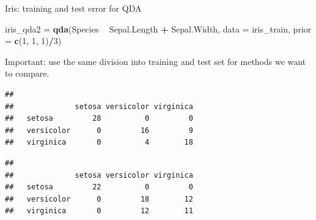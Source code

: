 \documentclass[10pt,ignorenonframetext,]{beamer}
\newenvironment{Shaded}{\begin{snugshade}}{\end{snugshade}}
\newcommand{\KeywordTok}[1]{\textcolor[rgb]{0.13,0.29,0.53}{\textbf{#1}}}
\newcommand{\DataTypeTok}[1]{\textcolor[rgb]{0.13,0.29,0.53}{#1}}
\newcommand{\DecValTok}[1]{\textcolor[rgb]{0.00,0.00,0.81}{#1}}
\newcommand{\StringTok}[1]{\textcolor[rgb]{0.31,0.60,0.02}{#1}}
\newcommand{\CommentTok}[1]{\textcolor[rgb]{0.56,0.35,0.01}{\textit{#1}}}
\newcommand{\OperatorTok}[1]{\textcolor[rgb]{0.81,0.36,0.00}{\textbf{#1}}}
\newcommand{\NormalTok}[1]{#1}
\begin{document}
\begin{frame}[fragile]

\begin{block}{Iris: training and test error for QDA}

\begin{Shaded}
\begin{Highlighting}[]
\NormalTok{iris_qda2 =}\StringTok{ }\KeywordTok{qda}\NormalTok{(Species }\OperatorTok{~}\StringTok{ }\NormalTok{Sepal.Length }\OperatorTok{+}\StringTok{ }\NormalTok{Sepal.Width, }\DataTypeTok{data =}\NormalTok{ iris_train, }
    \DataTypeTok{prior =} \KeywordTok{c}\NormalTok{(}\DecValTok{1}\NormalTok{, }\DecValTok{1}\NormalTok{, }\DecValTok{1}\NormalTok{)}\OperatorTok{/}\DecValTok{3}\NormalTok{)}
\end{Highlighting}
\end{Shaded}

Important: use the same division into training and test set for methods
we want to compare.

\end{block}

\end{frame}

\begin{frame}[fragile]

\begin{Shaded}
\end{Shaded}

\begin{verbatim}
##             
##              setosa versicolor virginica
##   setosa         28          0         0
##   versicolor      0         16         9
##   virginica       0          4        18
\end{verbatim}

\begin{Shaded}
\end{Shaded}

\begin{verbatim}
##             
##              setosa versicolor virginica
##   setosa         22          0         0
##   versicolor      0         18        12
##   virginica       0         12        11
\end{verbatim}

\end{frame}
\end{document}
